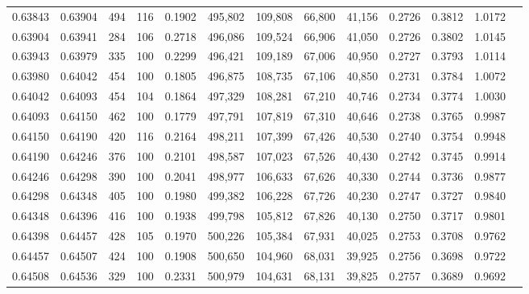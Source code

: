 \begin{tabular}{rrrrrrrrrrrrr}
0.63843 & 0.63904 &   494 & 116 &                                     0.1902 & 495,802 & 109,808 &  66,800 &  41,156 & 0.2726 & 0.3812 & 1.0172 \\
0.63904 & 0.63941 &   284 & 106 &                                     0.2718 & 496,086 & 109,524 &  66,906 &  41,050 & 0.2726 & 0.3802 & 1.0145 \\
0.63943 & 0.63979 &   335 & 100 &                                     0.2299 & 496,421 & 109,189 &  67,006 &  40,950 & 0.2727 & 0.3793 & 1.0114 \\
0.63980 & 0.64042 &   454 & 100 &                                     0.1805 & 496,875 & 108,735 &  67,106 &  40,850 & 0.2731 & 0.3784 & 1.0072 \\
0.64042 & 0.64093 &   454 & 104 &                                     0.1864 & 497,329 & 108,281 &  67,210 &  40,746 & 0.2734 & 0.3774 & 1.0030 \\
0.64093 & 0.64150 &   462 & 100 &                                     0.1779 & 497,791 & 107,819 &  67,310 &  40,646 & 0.2738 & 0.3765 & 0.9987 \\
0.64150 & 0.64190 &   420 & 116 &                                     0.2164 & 498,211 & 107,399 &  67,426 &  40,530 & 0.2740 & 0.3754 & 0.9948 \\
0.64190 & 0.64246 &   376 & 100 &                                     0.2101 & 498,587 & 107,023 &  67,526 &  40,430 & 0.2742 & 0.3745 & 0.9914 \\
0.64246 & 0.64298 &   390 & 100 &                                     0.2041 & 498,977 & 106,633 &  67,626 &  40,330 & 0.2744 & 0.3736 & 0.9877 \\
0.64298 & 0.64348 &   405 & 100 &                                     0.1980 & 499,382 & 106,228 &  67,726 &  40,230 & 0.2747 & 0.3727 & 0.9840 \\
0.64348 & 0.64396 &   416 & 100 &                                     0.1938 & 499,798 & 105,812 &  67,826 &  40,130 & 0.2750 & 0.3717 & 0.9801 \\
0.64398 & 0.64457 &   428 & 105 &                                     0.1970 & 500,226 & 105,384 &  67,931 &  40,025 & 0.2753 & 0.3708 & 0.9762 \\
0.64457 & 0.64507 &   424 & 100 &                                     0.1908 & 500,650 & 104,960 &  68,031 &  39,925 & 0.2756 & 0.3698 & 0.9722 \\
0.64508 & 0.64536 &   329 & 100 &                                     0.2331 & 500,979 & 104,631 &  68,131 &  39,825 & 0.2757 & 0.3689 & 0.9692 \\

\end{tabular}
